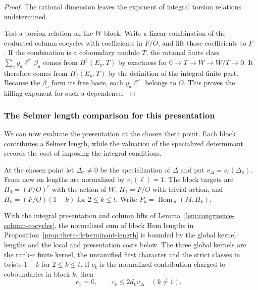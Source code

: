 \begin{proof}
The rational dimension leaves the exponent of integral torsion relations undetermined.

Test a torsion relation on the \(W\)-block. Write a linear combination
of the evaluated column cocycles with coefficients
in \(F/O\), and lift those coefficients to \(F\).
If the combination is a coboundary modulo \(T\),
the rational finite class \(\sum_a y_a\ell^{e'}\beta_a\)
comes from \(H^1(E_u,T)\) by exactness for
\(0\to T\to W\to W/T\to0\).
It therefore comes from \(H^1_f(E_u,T)\) by the
definition of the integral finite part. Because
the \(\beta_a\) form its free basis, each
\(y_a\ell^{e'}\) belongs to \(O\). This proves the
killing exponent for such a dependence.   \label{cor:congruence-determinant-3}

\end{proof}

\subsubsection*{The Selmer length comparison for this presentation}
\label{subsec:congruence-selmer}

We can now evaluate the presentation at the chosen theta point. Each block contributes a Selmer length, while the valuation of the specialized determinant records the cost of imposing the integral conditions.

At the chosen point let \(\Delta_\pi\ne0\) be the
specialization of \(\Delta\) and put \(v_\Delta
=v_\ell(\Delta_\pi)\). From now on lengths are
normalized by \(v_\ell(\ell)=1\).
The block targets are \(H_0=(F/O)^r\) with the
action of \(W\), \(H_1=F/O\) with trivial action,
and \(H_k=(F/O)(1-k)\) for \(2\le k\le t\).
Write \(P_k=\operatorname{Hom}_{\mathcal A}(M,H_k)\).
\begin{proposition}
\label{prop:congruence-block-selmer-length}
With the integral presentation and column lifts of
Lemma~\ref{lem:congruence-column-cocycles}, the normalized sum of
block Hom lengths in Proposition~\ref{prop:theta-determinant-length}
is bounded by the global kernel lengths and the local and
presentation costs below. The three global kernels are
the rank-\(r\) finite kernel, the unramified first character and
the strict classes in twists \(1-k\) for \(2\le k\le t\).
If \(c_k\) is the normalized contribution charged to coboundaries in block \(k\), then
\[
 c_1=0,\qquad c_k\le2d_kv_\Delta\quad(k\ne1).
\]
\end{proposition}

